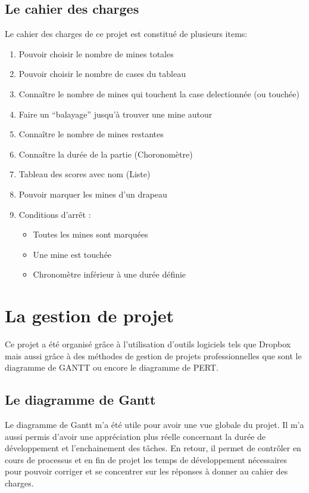 \documentclass[a4paper,11pt]{article}
\begin{document}
\subsection{Le cahier des charges}
Le cahier des charges de ce projet est constitué de plusieurs items:

\begin{enumerate}
 \item Pouvoir choisir le nombre de mines totales
 \item Pouvoir choisir le nombre de cases du tableau
 \item Connaître le nombre de mines qui touchent la case delectionnée (ou touchée)
 \item Faire un ``balayage'' jusqu'à trouver une mine autour
 \item Connaître le nombre de mines restantes
 \item Connaître la durée de la partie (Choronomètre)
 \item Tableau des scores avec nom (Liste)
 \item Pouvoir marquer les mines d'un drapeau
 \item Conditions d'arrêt : 
 \begin{itemize}
  \item Toutes les mines sont marquées
  \item Une mine est touchée
  \item Chronomètre inférieur à une durée définie
 \end{itemize}
\end{enumerate}
\section{La gestion de projet}

Ce projet a été organisé grâce à l'utilisation d'outils logiciels tels que Dropbox mais aussi grâce à des méthodes de gestion
de projets professionnelles que sont le diagramme de GANTT ou encore le diagramme de PERT.
\subsection{Le diagramme de Gantt}
Le diagramme de Gantt m'a été utile pour avoir une vue globale du projet. Il m'a aussi permis d'avoir une appréciation 
plus réelle concernant la durée de développement et l'enchainement des tâches. 
En retour, il permet de contrôler en cours de processus et en fin de projet les temps de développement nécessaires pour pouvoir corriger et
se concentrer sur les réponses à donner au cahier des charges.
\end{document}
